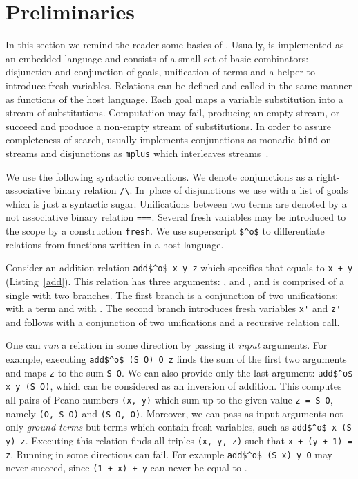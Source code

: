 \section{Preliminaries}

In this section we remind the reader some basics of \mk.
Usually, \mk is implemented as an embedded language and consists of a small set of basic combinators: disjunction and conjunction of goals, unification of terms and a helper to introduce fresh variables.
Relations can be defined and called in the same manner as functions of the host language.
Each \mk goal maps a variable substitution into a stream of substitutions.
Computation may fail, producing an empty stream, or succeed and produce a non-empty stream of substitutions.
In order to assure completeness of search, \mk usually implements conjunctions as monadic \lstinline{bind} on streams and disjunctions as \lstinline{mplus} which interleaves streams~.

We use the following syntactic conventions.
We denote conjunctions as a right-associative binary relation \lstinline{/\}.
In~place of disjunctions we use \conde with a list of \mk goals which is just a syntactic sugar.
Unifications between two terms are denoted by a not associative binary relation \lstinline{===}.
Several fresh variables may be introduced to the scope by a construction \lstinline{fresh}.
We use superscript \lstinline{$^o$} to differentiate \mk relations from functions written in a host language.

Consider an addition relation \lstinline{add$^o$ x y z} which specifies that \z equals to \lstinline{x + y} (Listing~\ref{add}).
This relation has three arguments: \x, \y and \z, and is comprised of a single \conde with two branches.
The first \conde branch is a conjunction of two unifications: \x with a term \zero and \y with \z.
The second \conde branch introduces fresh variables \lstinline{x'} and \lstinline{z'} and follows with a conjunction of two unifications and a recursive relation call.

One can \emph{run} a relation in some direction by passing it \emph{input} arguments.
For example, executing \lstinline{add$^o$ (S O) O z} finds the sum of the first two arguments and maps \lstinline{z} to the sum \lstinline{S O}.
We can also provide only the last argument: \lstinline{add$^o$ x y (S O)}, which can be considered as an inversion of addition.
This computes all pairs of Peano numbers \lstinline{(x, y)} which sum up to the given value \lstinline{z = S O}, namely \lstinline{(O, S O)} and \lstinline{(S O, O)}.
Moreover, we can pass as input arguments not only \emph{ground terms} but terms which contain fresh variables, such as \lstinline{add$^o$ x (S y) z}.
Executing this relation finds all triples \lstinline{(x, y, z)} such that \lstinline{x + (y + 1) = z}.
Running in some directions can fail.
For example \lstinline{add$^o$ (S x) y O} may never succeed, since \lstinline{(1 + x) + y} can never be equal to \zero.

